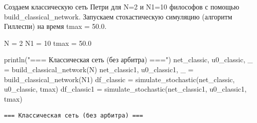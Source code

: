 \documentclass[
  12pt,
  a4paper,
  DIV=11,
  numbers=noendperiod]{scrreprt}
\newenvironment{Shaded}{\begin{snugshade}}{\end{snugshade}}
\newcommand{\FloatTok}[1]{\textcolor[rgb]{0.68,0.00,0.00}{#1}}
\newcommand{\FunctionTok}[1]{\textcolor[rgb]{0.28,0.35,0.67}{#1}}
\newcommand{\NormalTok}[1]{\textcolor[rgb]{0.00,0.23,0.31}{#1}}
\newcommand{\OperatorTok}[1]{\textcolor[rgb]{0.37,0.37,0.37}{#1}}
\newcommand{\StringTok}[1]{\textcolor[rgb]{0.13,0.47,0.30}{#1}}
\begin{document}
Создаем классическую сеть Петри для N=2 и N1=10 философов с помощью
build\_classical\_network. Запускаем стохастическую симуляцию (алгоритм
Гиллеспи) на время tmax = 50.0.

\begin{Shaded}
\begin{Highlighting}[]
\NormalTok{N }\OperatorTok{=} \FloatTok{2}
\NormalTok{N1 }\OperatorTok{=} \FloatTok{10}
\NormalTok{tmax }\OperatorTok{=} \FloatTok{50.0}

\FunctionTok{println}\NormalTok{(}\StringTok{"=== Классическая сеть (без арбитра) ==="}\NormalTok{)}
\NormalTok{net\_classic, u0\_classic, \_ }\OperatorTok{=} \FunctionTok{build\_classical\_network}\NormalTok{(N)}
\NormalTok{net\_classic1, u0\_classic1, \_ }\OperatorTok{=} \FunctionTok{build\_classical\_network}\NormalTok{(N1)}
\NormalTok{df\_classic }\OperatorTok{=} \FunctionTok{simulate\_stochastic}\NormalTok{(net\_classic, u0\_classic, tmax)}
\NormalTok{df\_classic1 }\OperatorTok{=} \FunctionTok{simulate\_stochastic}\NormalTok{(net\_classic1, u0\_classic1, tmax)}
\end{Highlighting}
\end{Shaded}

\begin{verbatim}
=== Классическая сеть (без арбитра) ===
\end{verbatim}
\end{document}
